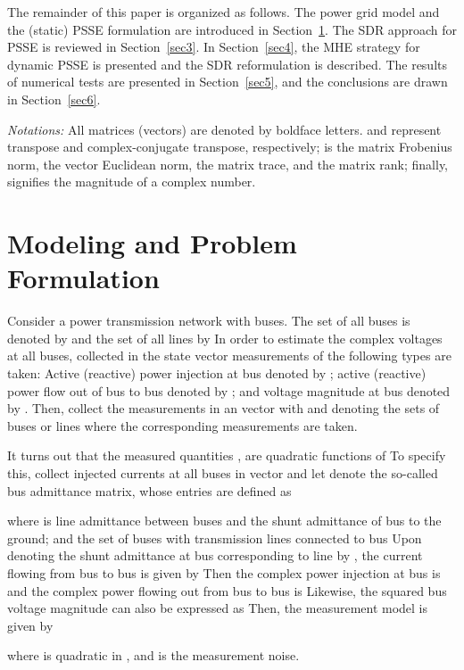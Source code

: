 \documentclass[conference]{IEEEtran}
\begin{document}
The remainder of this paper is organized as follows. The power grid model and the (static) PSSE formulation are introduced in Section~\ref{sec2}. The SDR approach for PSSE is reviewed in Section~\ref{sec3}. In Section~\ref{sec4}, the MHE strategy for dynamic PSSE is presented and the SDR reformulation is described. The results of numerical tests are presented in Section~\ref{sec5}, and the conclusions are drawn in Section~\ref{sec6}.

\emph{Notations:} All matrices (vectors) are denoted by boldface letters.  and  represent transpose and complex-conjugate transpose, respectively;  is the matrix Frobenius norm,  the vector Euclidean norm,  the matrix trace, and  the matrix rank; finally,  signifies the magnitude of a complex number.



\section{Modeling and Problem Formulation}
\label{sec2}
Consider a power transmission network with  buses. The set of all buses is denoted by  and the set of all lines by  In order to estimate the complex voltages  at all buses, collected in the state vector   measurements of the following types are taken: Active (reactive) power injection at bus  denoted by  ; active (reactive) power flow out of bus  to bus  denoted by  ; and voltage magnitude at bus  denoted by .
Then, collect the measurements in an  vector   with     and  denoting the sets of buses or lines where the corresponding measurements are taken.

It turns out that the measured quantities  ,  are quadratic functions of  To specify this, collect injected currents at all buses in vector  and let  denote the so-called bus admittance matrix, whose entries are defined as

where  is line admittance between buses  and   the shunt admittance of bus  to the ground; and  the set of buses with transmission lines connected to bus  Upon denoting the shunt admittance at bus  corresponding to line  by , the current flowing from bus  to bus  is given by  Then the complex power injection at bus  is  and the complex power flowing out from bus  to bus  is  Likewise, the squared bus voltage magnitude can also be expressed as  Then, the measurement model is given by

where  is quadratic in , and  is the measurement noise.
\end{document}
